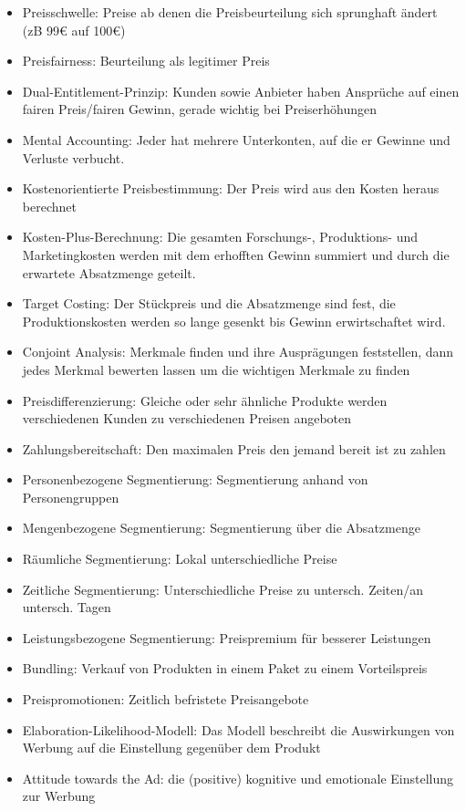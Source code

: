 \documentclass[]{article}
\begin{document}
\begin{itemize}
    \item Preisschwelle: Preise ab denen die Preisbeurteilung sich sprunghaft ändert (zB 99€ auf 100€)
    \item Preisfairness: Beurteilung als legitimer Preis
    \item Dual-Entitlement-Prinzip: Kunden sowie Anbieter haben Ansprüche auf einen fairen Preis/fairen Gewinn, gerade wichtig bei Preiserhöhungen
    \item Mental Accounting: Jeder hat mehrere Unterkonten, auf die er Gewinne und Verluste verbucht.
    \item Kostenorientierte Preisbestimmung: Der Preis wird aus den Kosten heraus berechnet
    \item Kosten-Plus-Berechnung: Die gesamten Forschungs-, Produktions- und Marketingkosten werden mit dem erhofften Gewinn summiert und durch die erwartete Absatzmenge geteilt.
    \item Target Costing: Der Stückpreis und die Absatzmenge sind fest, die Produktionskosten werden so lange gesenkt bis Gewinn erwirtschaftet wird.
    \item Conjoint Analysis: Merkmale finden und ihre Ausprägungen feststellen, dann jedes Merkmal bewerten lassen um die wichtigen Merkmale zu finden
    \item Preisdifferenzierung: Gleiche oder sehr ähnliche Produkte werden verschiedenen Kunden zu verschiedenen Preisen angeboten
    \item Zahlungsbereitschaft: Den maximalen Preis den jemand bereit ist zu zahlen
    \item Personenbezogene Segmentierung: Segmentierung anhand von Personengruppen
    \item Mengenbezogene Segmentierung: Segmentierung über die Absatzmenge
    \item Räumliche Segmentierung: Lokal unterschiedliche Preise
    \item Zeitliche Segmentierung: Unterschiedliche Preise zu untersch. Zeiten/an untersch. Tagen
    \item Leistungsbezogene Segmentierung: Preispremium für besserer Leistungen
    \item Bundling: Verkauf von Produkten in einem Paket zu einem Vorteilspreis
    \item Preispromotionen: Zeitlich befristete Preisangebote
    \item Elaboration-Likelihood-Modell: Das Modell beschreibt die Auswirkungen von Werbung auf die Einstellung gegenüber dem Produkt
    \item Attitude towards the Ad: die (positive) kognitive und emotionale Einstellung zur Werbung

\end{itemize}
\end{document}
